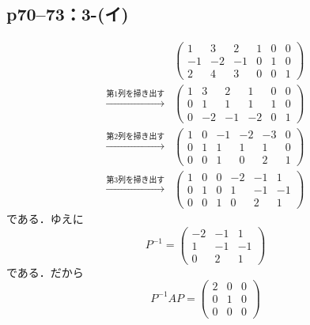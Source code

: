 \documentclass[a4paper,10pt,fleqn]{ltjsarticle}
\begin{document}
\subsection*{p70--73：3-(イ)}

\begin{leftbar}
  \begin{align*}
                                    &
    \left(
    \begin{array}{ccc|ccc}
        1  & 3  & 2  & 1 & 0 & 0 \\
        -1 & -2 & -1 & 0 & 1 & 0 \\
        2  & 4  & 3  & 0 & 0 & 1
      \end{array}
    \right)                           \\
    \xrightarrow{\text{第$1$列を掃き出す}} &
    \left(
    \begin{array}{ccc|ccc}
        1 & 3  & 2  & 1  & 0 & 0 \\
        0 & 1  & 1  & 1  & 1 & 0 \\
        0 & -2 & -1 & -2 & 0 & 1
      \end{array}
    \right)                           \\
    \xrightarrow{\text{第$2$列を掃き出す}} &
    \left(
    \begin{array}{ccc|ccc}
        1 & 0 & -1 & -2 & -3 & 0 \\
        0 & 1 & 1  & 1  & 1  & 0 \\
        0 & 0 & 1  & 0  & 2  & 1
      \end{array}
    \right)                           \\
    \xrightarrow{\text{第$3$列を掃き出す}} &
    \left(
    \begin{array}{ccc|ccc}
        1 & 0 & 0 & -2 & -1 & 1  \\
        0 & 1 & 0 & 1  & -1 & -1 \\
        0 & 0 & 1 & 0  & 2  & 1
      \end{array}
    \right)
  \end{align*}
  である．ゆえに
  \[
    P^{-1} = \begin{pmatrix} -2 & -1 & 1\\ 1 & -1 & -1 \\ 0 & 2 & 1 \end{pmatrix}
  \]
  である．だから
  \[
    P^{-1} A P = \begin{pmatrix} 2 & 0 & 0 \\ 0 & 1 & 0 \\ 0 & 0 & 0 \end{pmatrix}
  \]
\end{leftbar}
\end{document}
